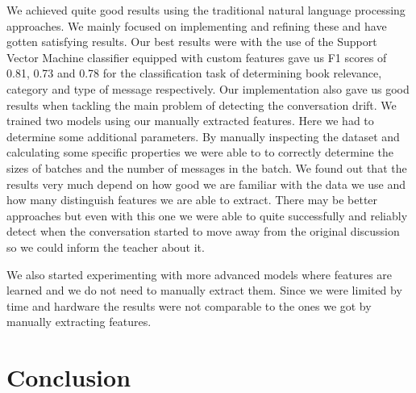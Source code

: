 \documentclass[11pt,a4paper]{article}
\begin{document}
We achieved quite good results using the traditional natural language processing approaches.
We mainly focused on implementing and refining these and have gotten satisfying results.
Our best results were with the use of the Support Vector Machine classifier equipped with custom features gave us F1 scores of 0.81, 0.73 and 0.78 for the classification task of determining book relevance, category and type of message respectively.
Our implementation also gave us good results when tackling the main problem of detecting the conversation drift.
We trained two models using our manually extracted features.
Here we had to determine some additional parameters.
By manually inspecting the dataset and calculating some specific properties we were able to to correctly determine the sizes of batches and the number of messages in the batch.
We found out that the results very much depend on how good we are familiar with the data we use and how many distinguish features we are able to extract.
There may be better approaches but even with this one we were able to quite successfully and reliably detect when the conversation started to move away from the original discussion so we could inform the teacher about it.

We also started experimenting with more advanced models where features are learned and we do not need to manually extract them.
Since we were limited by time and hardware the results were not comparable to the ones we got by manually extracting features.



\section{Conclusion}
\end{document}
